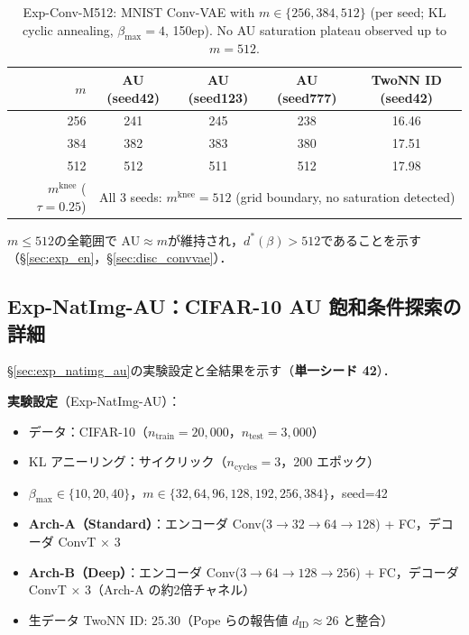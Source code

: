 \documentclass[11pt,a4paper]{jsarticle}
\newcommand{\mknee}{m^{\mathrm{knee}}}
\begin{document}
\begin{table}[H]
\centering
\caption{Exp-Conv-M512: MNIST Conv-VAE with $m \in \{256, 384, 512\}$ (per seed; KL cyclic annealing, $\beta_\mathrm{max}=4$, 150ep). No AU saturation plateau observed up to $m=512$.}
\label{tab:en_ext}
\small
\begin{tabular}{r ccc c}
\toprule
$m$ & AU (seed42) & AU (seed123) & AU (seed777) & TwoNN ID (seed42) \\
\midrule
256 & 241 & 245 & 238 & 16.46 \\
384 & 382 & 383 & 380 & 17.51 \\
512 & 512 & 511 & 512 & 17.98 \\
\midrule
$\mknee$ ($\tau=0.25$) & \multicolumn{4}{c}{All 3 seeds: $\mknee=512$ (grid boundary, no saturation detected)} \\
\bottomrule
\end{tabular}
\end{table}

$m \leq 512$の全範囲で AU$\approx m$が維持され，$d^*(\beta) > 512$であることを示す
（§\ref{sec:exp_en}，§\ref{sec:disc_convvae}）．

\subsection*{Exp-NatImg-AU：CIFAR-10 AU 飽和条件探索の詳細}

§\ref{sec:exp_natimg_au}の実験設定と全結果を示す（\textbf{単一シード 42}）．

\textbf{実験設定}（Exp-NatImg-AU）：
\begin{itemize}
  \item データ：CIFAR-10（$n_{\mathrm{train}}=20{,}000$，$n_{\mathrm{test}}=3{,}000$）
  \item KL アニーリング：サイクリック（$n_{\mathrm{cycles}}=3$，200 エポック）
  \item $\beta_{\max} \in \{10, 20, 40\}$，$m \in \{32, 64, 96, 128, 192, 256, 384\}$，seed=42
  \item \textbf{Arch-A（Standard）}：エンコーダ Conv($3{\to}32{\to}64{\to}128$) + FC，デコーダ ConvT × 3
  \item \textbf{Arch-B（Deep）}：エンコーダ Conv($3{\to}64{\to}128{\to}256$) + FC，デコーダ ConvT × 3（Arch-A の約2倍チャネル）
  \item 生データ TwoNN ID: $25.30$（Pope ら\cite{pope2021intrinsic}の報告値 $d_\mathrm{ID} \approx 26$ と整合）
\end{itemize}
\end{document}
